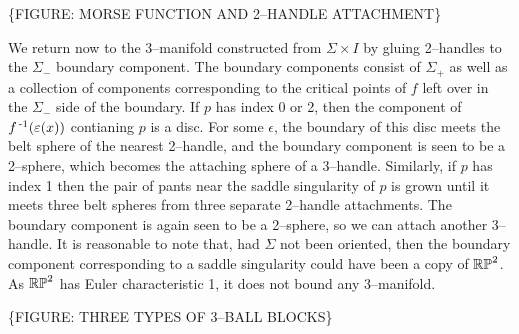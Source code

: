\{FIGURE: MORSE FUNCTION AND 2--HANDLE ATTACHMENT\}



We return now to the 3--manifold constructed from $\Sigma\times I$ by gluing 2--handles to the $\Sigma_-$ boundary component.
The boundary components consist of $\Sigma_+$ as well as a collection of components corresponding to the critical points of $f$ left over in the $\Sigma_-$ side of the boundary.
If $p$ has index 0 or 2, then the component of $f^{\,\text{-}1}(\varepsilon(x))$ contianing $p$ is a disc.
For some $\epsilon$, the boundary of this disc meets the belt sphere of the nearest 2--handle, and the boundary component is seen to be a 2--sphere, which becomes the attaching sphere of a 3--handle.
Similarly, if $p$ has index 1 then the pair of pants near the saddle singularity of $p$ is grown until it meets three belt spheres from three separate 2--handle attachments.
The boundary component is again seen to be a 2--sphere, so we can attach another 3--handle.
It is reasonable to note that, had $\Sigma$ not been oriented, then the boundary component corresponding to a saddle singularity could have been a copy of $\mathbb{RP}^2$.
As $\mathbb{RP}^2$ has Euler characteristic 1, it does not bound any 3--manifold.

\{FIGURE: THREE TYPES OF 3--BALL BLOCKS\}
